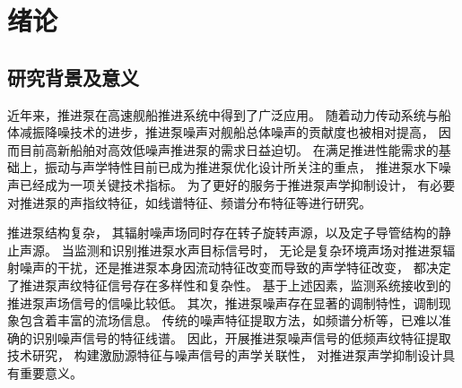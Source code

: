 \chapter{绪论}

\section{研究背景及意义}
近年来，推进泵在高速舰船推进系统中得到了广泛应用\cite{carltonMarinePropellersPropulsion2018}。
随着动力传动系统与船体减振降噪技术的进步，推进泵噪声对舰船总体噪声的贡献度也被相对提高，
因而目前高新船舶对高效低噪声推进泵的需求日益迫切\cite{ozdenUnderwaterRadiatedNoise2016}。
在满足推进性能需求的基础上，振动与声学特性目前已成为推进泵优化设计所关注的重点，
推进泵水下噪声已经成为一项关键技术指标。
为了更好的服务于推进泵声学抑制设计，
有必要对推进泵的声指纹特征，如线谱特征、频谱分布特征等进行研究。

\begin{comment}
推进泵噪声机理较为复杂，抛开空化噪声不谈仅从流致噪声角度考虑，其频谱已呈现宽带与线谱交叠的形貌。
推进泵内非定常流动与水力部件相互作用产生的流致激励是重要的噪声激励源，
推进泵噪声信号中蕴含着丰富的流致激励源信息，流致激励源特征能反映推进泵的运行状态和结构信息。
当推进泵内流动发生显著改变时，其噪声信号的低频声纹理特性也会发生变化。
无论是从特征声源信号识别，或是发展噪声能量主动控制技术角度，
构建推进泵流致激励源识别的有效方法，建立流致激励源特征与噪声信号之间的联系都尤为重要。
\end{comment}

推进泵结构复杂，
其辐射噪声场同时存在转子旋转声源，以及定子导管结构的静止声源。
当监测和识别推进泵水声目标信号时，
无论是复杂环境声场对推进泵辐射噪声的干扰，还是推进泵本身因流动特征改变而导致的声学特征改变，
都决定了推进泵声纹特征信号存在多样性和复杂性\cite{__2016杨琼方}。
基于上述因素，监测系统接收到的推进泵声场信号的信噪比较低。
其次，推进泵噪声存在显著的调制特性，调制现象包含着丰富的流场信息。
传统的噪声特征提取方法，如频谱分析等，已难以准确的识别噪声信号的特征线谱。
因此，开展推进泵噪声信号的低频声纹特征提取技术研究，
构建激励源特征与噪声信号的声学关联性，
对推进泵声学抑制设计具有重要意义。

\begin{comment}
传统的频谱分析方法已经无法准确的对流致激励特征声源进行识别，以及对推进泵的运行状态进行表征。
其噪声信号中存在复杂的干扰因素：其一，推进泵处在复杂的背景环境声场中，
动力系统等辅助结构产生的辐射噪声也给目标声源信号带来了很大干扰，影响
测试系统对推进泵目标真实辐射噪声信号的监测；其二，推进泵结构复杂，
推进泵辐射噪声场同时存在转子旋转声源，以及定子导管结构的静止声源，
其辐射噪声具有分量复杂性。基于上述因素，监测系统接收到的目标声场信号的信噪比较低。特征信
号如流致激励源特征频率、轴频等与其他背景噪声相比均较为微弱，
给基于传统噪声特征提取方法带来了困难，难以准确的识别噪声信号的流致激励源特征。
其次，推进泵噪声存在显著的调制特性，调制现象包含着丰富的流场信息，
但是传统的频谱分析及解调方法无法实现高精度低频调制特征的提取。
因此，开展低信噪比工况下的推进泵噪声信号的低频特征提取技术研究
有重要的理论和工程意义。
\end{comment}

